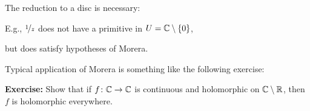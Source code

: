 \documentclass[10pt,aspectratio=169]{beamer}
\begin{document}
\begin{frame}
The reduction to a disc is necessary:

E.g., $\nicefrac{1}{z}$
does not have a primitive in $U = {\mathbb{C}} \setminus \{ 0 \}$,

but does
satisfy hypotheses of Morera.

\medskip
\pause

Typical application of Morera is something like the following exercise:

\medskip
\pause

\textbf{Exercise:}
Show that if $f \colon {\mathbb{C}} \to {\mathbb{C}}$ is continuous and holomorphic on ${\mathbb{C}}
\setminus {\mathbb{R}}$, then $f$ is holomorphic everywhere.
\end{frame}
\end{document}

